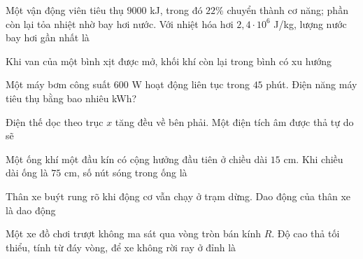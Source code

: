 \begin{ex}
Một vận động viên tiêu thụ $9000$ kJ, trong đó $22\%$ chuyển thành cơ năng; phần còn lại tỏa nhiệt nhờ bay hơi nước. Với nhiệt hóa hơi $2{,}4\cdot10^6$ J/kg, lượng nước bay hơi gần nhất là
\end{ex}

\begin{ex}
Khi van của một bình xịt được mở, khối khí còn lại trong bình có xu hướng
\end{ex}

\begin{ex}
Một máy bơm công suất $600$ W hoạt động liên tục trong $45$ phút. Điện năng máy tiêu thụ bằng bao nhiêu kWh?
\end{ex}

\begin{ex}
Điện thế dọc theo trục $x$ tăng đều về bên phải. Một điện tích âm được thả tự do sẽ
\end{ex}

\begin{ex}
Một ống khí một đầu kín có cộng hưởng đầu tiên ở chiều dài $15$ cm. Khi chiều dài ống là $75$ cm, số nút sóng trong ống là
\end{ex}

\begin{ex}
Thân xe buýt rung rõ khi động cơ vẫn chạy ở trạm dừng. Dao động của thân xe là dao động
\end{ex}

\begin{ex}
Một xe đồ chơi trượt không ma sát qua vòng tròn bán kính $R$. Độ cao thả tối thiểu, tính từ đáy vòng, để xe không rời ray ở đỉnh là
\end{ex}

